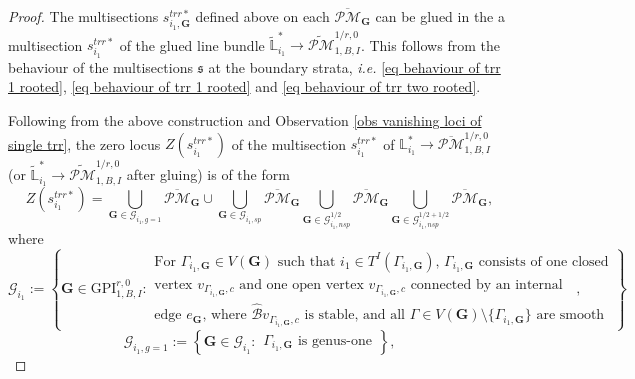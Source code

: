\documentclass[11pt]{amsart}
\theoremstyle{definition}
\theoremstyle{remark}
\newcommand{\oPMb}{{\overline{\mathcal{PM}}}}
\newcommand{\nontilde}{}
\newcommand{\<}{\left<}
\renewcommand{\>}{\right>}
\numberwithin{equation}{section}
\def\GPI{{\text{GPI}}}
\begin{document}
\begin{proof}
        The multisections $\nontilde{s}^{trr*}_{i_1,\mathbf{G}}$ defined above on each $\oPMb_{\mathbf{G}}$ can be glued in the a multisection $\nontilde{s}^{trr*}_{i_1}$ of the glued line bundle $\widetilde{\mathbb L}^*_{i_1}\to \widetilde{\mathcal{PM}}^{1/r,0}_{1,B,I}$. This follows from the behaviour of the multisections $\mathfrak s$ at the boundary strata, \textit{i.e.} \eqref{eq behaviour of trr 1 rooted}, \eqref{eq behaviour of trr 1 rooted} and \eqref{eq behaviour of trr two rooted}.

    
        Following from the above construction and Observation \ref{obs vanishing loci of single trr}, the zero locus $Z(\nontilde{s}^{trr*}_{i_1})$ of the multisection $\nontilde{s}^{trr*}_{i_1}$ of ${\mathbb L}^*_{i_1}\to \oPMb^{1/r,0}_{1,B,I}$ (or $\widetilde{\mathbb L}^*_{i_1}\to \widetilde{\mathcal{PM}}^{1/r,0}_{1,B,I}$ after gluing) is of the form
        \begin{equation} \label{eq of a single global trr of Lstar}
        Z(\nontilde{s}^{trr*}_{i_1})=\bigcup_{\bm{G}\in \bm{\mathcal G}_{i_1,g=1} } \oPMb_{\bm{G}} \cup \bigcup_{\bm{G}\in  \bm{\mathcal G}_{i_1,sp} } \oPMb_{\bm{G}} \bigcup_{\bm{G}\in  \bm{\mathcal G}^{1/2}_{i_1,nsp} } \oPMb_{\bm{G}} \bigcup_{\bm{G}\in \bm{\mathcal G}^{1/2+1/2}_{i_1,nsp}} \oPMb_{\bm{G}},
        \end{equation}
        where 
        \begin{equation*}
             \bm{\mathcal G}_{i_1}:=\left\{ \bm{G}\in \GPI_{1,B,I}^{r,0} \colon  \begin{array}{ccc} \text{For   $\Gamma_{i_1,\bm{G}}\in V(\bm{G})$  such that  $i_1\in T^I(\Gamma_{i_1,\bm{G}})$, $\Gamma_{i_1,\bm{G}}$ consists of one closed}\\ \text{vertex $v_{\Gamma_{i_1,\bm{G}},c}$ and one open vertex $v_{\Gamma_{i_1,\bm{G}},c}$ connected by an internal}
             \\ \text{edge $e_{\bm{G}}$, where $\hat{\mathcal B} v_{\Gamma_{i_1,\bm{G}},c}$ is stable, and all $\Gamma\in V(\bm{G})\setminus\{\Gamma_{i_1,\bm{G}}\}$ are smooth}
             \end{array}\right\},
        \end{equation*}
        \begin{equation*}
             \bm{\mathcal G}^{}_{i_1,g=1}:=\left\{ \bm{G}\in \bm{\mathcal G}_{i_1} \colon  \begin{array}{c} \text{$\Gamma_{i_1,\bm{G}}$ is genus-one}
             \end{array}\right\},
        \end{equation*}

\end{proof}
\end{document}
